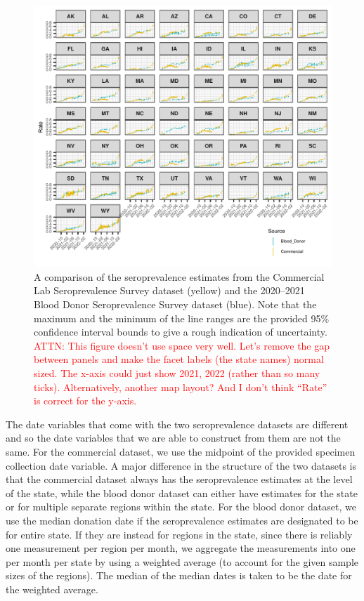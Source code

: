\documentclass{article}
\newcommand{\attn }[1]{\textcolor{red}{ATTN: #1}}
\begin{document}
\begin{figure}[!tb]
\centering
    \includegraphics[width=.99\textwidth]{sero_blood_comm_compar.pdf}
    \caption{A comparison of the seroprevalence estimates from the Commercial
    Lab Seroprevalence Survey dataset (yellow) and the 2020--2021 Blood Donor 
    Seroprevalence Survey dataset (blue). Note that the maximum and the minimum
    of the line ranges are the provided 95\% confidence interval bounds to 
    give a rough indication of uncertainty. \attn{This figure doesn't use space
    very well. Let's remove the gap between panels and make the facet labels
    (the state names) normal sized. The x-axis could just show 2021, 2022 (rather
    than so many ticks). Alternatively, another map layout? And I don't think
    ``Rate'' is correct for the y-axis.}}
    \label{fig:sero_blood_comm_compar}
\end{figure}

The date variables that come with the two seroprevalence datasets are different
and so the date variables that we are able to construct from them are not the
same. For the commercial dataset, we use the midpoint of the provided specimen
collection date variable. A major difference in the structure of the two
datasets is that the commercial dataset always has the seroprevalence estimates
at the level of the state, while the blood donor dataset can either have
estimates for the state or for multiple separate regions within the state. For
the blood donor dataset, we use the median donation date if the seroprevalence
estimates are designated to be for entire state. If they are instead for regions
in the state, since there is reliably one measurement per region per month, we
aggregate the measurements into one per month per state by using a weighted
average (to account for the given sample sizes of the regions). The median of
the median dates is taken to be the date for the weighted average.
\end{document}
